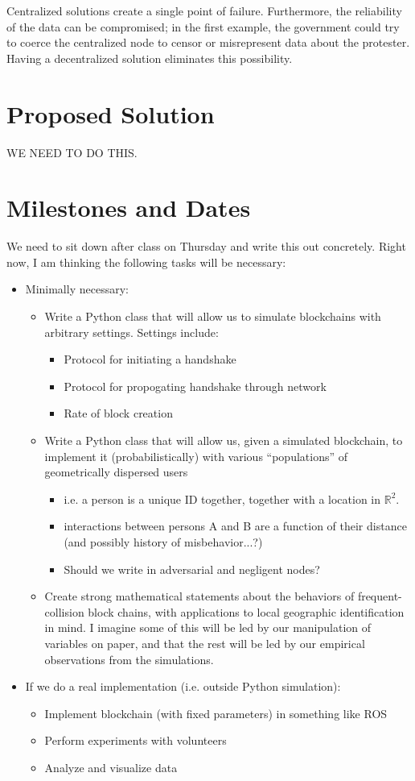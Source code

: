\documentclass{article}
\begin{document}
Centralized solutions create a single point of failure.
Furthermore,
the reliability of the data can be compromised;
in the first example,
the government could try to coerce the centralized node
to censor or misrepresent data about the protester.
Having a decentralized solution eliminates this possibility.


\section*{Proposed Solution}
WE NEED TO DO THIS.

\section*{Milestones and Dates}
We need to sit down after class on Thursday and write this out concretely. Right now, I am thinking the following tasks will be necessary:
\begin{itemize}
	\item Minimally necessary:
	\begin{itemize}
		\item Write a Python class that will allow us to simulate blockchains with arbitrary settings. Settings include:
		\begin{itemize}
			\item Protocol for initiating a handshake
			\item Protocol for propogating handshake through network
			\item Rate of block creation
		\end{itemize}
		\item Write a Python class that will allow us, given a simulated blockchain, to implement it (probabilistically) with various ``populations'' of geometrically dispersed users
		\begin{itemize}
			\item i.e. a person is a unique ID together, together with a location in $\mathbb{R}^2$.
			\item interactions between persons A and B are a function of their distance (and possibly history of misbehavior...?)
			\item Should we write in adversarial and negligent nodes?
		\end{itemize}
		\item Create strong mathematical statements about the behaviors of frequent-collision block chains, with applications to local geographic identification in mind. I imagine some of this will be led by our manipulation of variables on paper, and that the rest will be led by our empirical observations from the simulations.
	\end{itemize}
	\item If we do a real implementation (i.e. outside Python simulation):
	\begin{itemize}
		\item Implement blockchain (with fixed parameters) in something like ROS
		\item Perform experiments with volunteers
		\item Analyze and visualize data
	\end{itemize}
\end{itemize}
\end{document}
